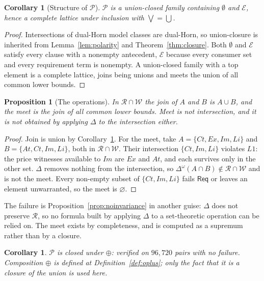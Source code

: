 \documentclass[11pt,reqno]{amsart}
\theoremstyle{plain}
\newtheorem{proposition}[theorem]{Proposition}
\newtheorem{corollary}[theorem]{Corollary}
\theoremstyle{definition}
\theoremstyle{remark}
\newcommand{\Pos}{\mathcal{P}}
\newcommand{\El}{\mathcal{E}}
\newcommand{\Law}{\mathsf{Req}}
\begin{document}
\begin{corollary}[Structure of $\Pos$]\label{cor:lattice}
$\Pos$ is a union-closed family containing $\emptyset$ and $\El$, hence a
complete lattice under inclusion with $\bigvee = \bigcup$.
\end{corollary}

\begin{proof}
Intersections of dual-Horn model classes are dual-Horn, so union-closure is
inherited from Lemma~\ref{lem:polarity} and Theorem~\ref{thm:closure}. Both $\emptyset$ and $\El$ satisfy every clause with a nonempty antecedent,
$\El$ because every consumer set and every requirement term is nonempty. A
union-closed family with a top element is a complete lattice, joins being unions
and meets the union of all common lower bounds.
\end{proof}

\begin{proposition}[The operations]\label{prop:joinmeet}
In $\mathcal{R} \cap \mathcal{W}$ the join of $A$ and $B$ is $A \cup B$, and the
meet is the join of all common lower bounds. Meet is not intersection, and it is
not obtained by applying $\Delta$ to the intersection either.
\end{proposition}

\begin{proof}
Join is union by Corollary~\ref{cor:lattice}. For the meet, take
$A = \{Ct,Ex,Im,Li\}$ and $B = \{At,Ct,Im,Li\}$, both in
$\mathcal{R} \cap \mathcal{W}$. Their intersection $\{Ct,Im,Li\}$ violates $L1$:
the price witnesses available to $Im$ are $Ex$ and $At$, and each survives only
in the other set. $\Delta$ removes nothing from the intersection, so
$\Delta^{\omega}(A \cap B) \notin \mathcal{R} \cap \mathcal{W}$ and is not the
meet. Every non-empty subset of $\{Ct,Im,Li\}$ fails $\Law$ or leaves an
element unwarranted, so the meet is $\varnothing$.
\end{proof}

The failure is Proposition~\ref{prop:noinvariance} in another guise: $\Delta$ does
not preserve $\mathcal{R}$, so no formula built by applying $\Delta$ to a
set-theoretic operation can be relied on. The meet exists by completeness, and is
computed as a supremum rather than by a closure.

\begin{corollary}\label{cor:oplusclosed}
$\Pos$ is closed under $\oplus$: verified on $96{,}720$ pairs with no
failure. Composition $\oplus$ is defined at
Definition~\ref{def:oplus}; only the fact that it is a closure of the union is
used here.
\end{corollary}
\end{document}
